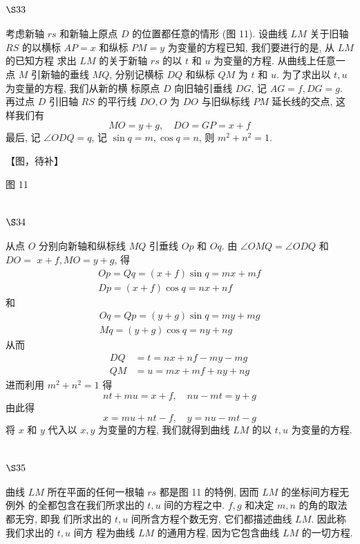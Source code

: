 \section{$\S 33$}

考虑新轴 $r s$ 和新轴上原点 $D$ 的位置都任意的情形 (图 11). 设曲线 $L M$ 关于旧轴 $R S$ 的以横标 $A P=x$ 和纵标 $P M=y$ 为变量的方程已知, 我们要进行的是, 从 $L M$ 的已知方程 求出 $L M$ 的关于新轴 $r s$ 的以 $t$ 和 $u$ 为变量的方程. 从曲线上任意一点 $M$ 引新轴的垂线 $M Q$, 分别记横标 $D Q$ 和纵标 $Q M$ 为 $t$ 和 $u$. 为了求出以 $t, u$ 为变量的方程, 我们从新的横 标原点 $D$ 向旧轴引垂线 $D G$, 记 $A G=f, D G=g$. 再过点 $D$ 引旧轴 $R S$ 的平行线 $D O, O$ 为 $D O$ 与旧纵标线 $P M$ 延长线的交点, 这样我们有
\[
M O=y+g, \quad D O=G P=x+f
\]
最后, 记 $\angle O D Q=q$, 记 $\sin q=m, \cos q=n$, 则 $m^{2}+n^{2}=1$.


【图，待补】

图 11

\section{$\S 34$}

从点 $O$ 分别向新轴和纵标线 $M Q$ 引垂线 $O p$ 和 $O q$. 由 $\angle O M Q=\angle O D Q$ 和 $D O=$ $x+f, M O=y+g$, 得
\[
\begin{gathered}
O p=Q q=(x+f) \sin q=m x+m f \\
D p=(x+f) \cos q=n x+n f
\end{gathered}
\]
和
\[
\begin{gathered}
O q=Q p=(y+g) \sin q=m y+m g \\
M q=(y+g) \cos q=n y+n g
\end{gathered}
\]
从而
\[
\begin{aligned}
D Q & =t=n x+n f-m y-m g \\
Q M & =u=m x+m f+n y+n g
\end{aligned}
\]
进而利用 $m^{2}+n^{2}=1$ 得
\[
n t+m u=x+f, \quad n u-m t=y+g
\]
由此得
\[
x=m u+n t-f, \quad y=n u-m t-g
\]
将 $x$ 和 $y$ 代入以 $x, y$ 为变量的方程, 我们就得到曲线 $L M$ 的以 $t, u$ 为变量的方程.

\section{$\S 35$}

曲线 $L M$ 所在平面的任何一根轴 $r s$ 都是图 11 的特例, 因而 $L M$ 的坐标间方程无例外 的全都包含在我们所求出的 $t, u$ 间的方程之中. $f, g$ 和决定 $m, n$ 的角的取法都无穷, 即我 们所求出的 $t, u$ 间所含方程个数无穷, 它们都描述曲线 $L M$. 因此称我们求出的 $t, u$ 间方 程为曲线 $L M$ 的通用方程, 因为它包含曲线 $L M$ 的一切方程.

